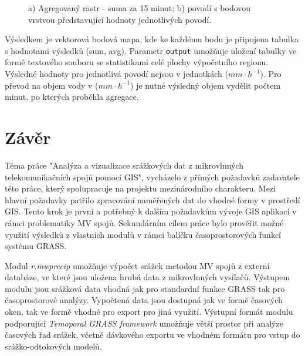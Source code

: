 \documentclass[a4paper,12pt,oneside]{report}
\newcommand{\necislovana}[1]{%
\phantomsection
\addcontentsline{toc}{section}{#1}
\section*{#1}
\markboth{\uppercase{#1}}{}
}
\begin{document}
\begin{figure}[h!]%
    \centering
    \qquad

    \caption[GUI modul]{ a) Agregovaný rastr - suma za 15 minut; b) povodí s bodovou vrstvou představující hodnoty jednotlivých povodí.  \centering  }
\end{figure}

Výsledkem je vektorová bodová mapa, kde ke každému bodu je připojena
tabulka s hodnotami výsledků (sum, avg). Parametr \texttt{output}
umožňuje uložení tabulky ve formě textového souboru se statistikami
celé plochy výpočetního regionu. Výsledné hodnoty pro jednotlivá
povodí nejsou v jednotkách ($mm \cdot h^{-1}$). Pro převod na objem
vody v ($mm \cdot h^{-1}$) je nutné výsledný objem vydělit počtem
minut, po kterých proběhla agregace.



\setcounter{footnote}{1}



\newpage
\necislovana{Závěr}

Téma práce "Analýza a vizualizace srážkových dat z mikrovlnných
telekomunikačních spojů pomocí GIS", vycházelo z přímých požadavků
zadavatele této práce, který spolupracuje na projektu mezinárodního
charakteru. Mezi hlavní požadavky patřilo zpracování naměřených dat do
vhodné formy v prostředí GIS. Tento krok je první a potřebný k dalším
požadavkům vývoje GIS aplikací v rámci problematiky MV
spojů. Sekundárním cílem práce bylo prověřit možné využití
výsledků z vlastních modulů v rámci balíčku časoprostorových funkcí
systému GRASS.

Modul \textit{r.mwprecip} umožňuje výpočet srážek metodou MV spojů z
externí databáze, ve které jsou uložena hrubá data z mikrovlnných
vysílačů. Výstupem modulu jsou srážková data vhodná jak pro standardní
funkce GRASS tak pro časoprostorové analýzy. Vypočtená data jsou
dostupná jak ve formě časových oken, tak ve formě vhodné pro export
pro jiná využití. Výstupní formát modulu podporující \textit{Temoporal GRASS
  framework} umožňuje větší prostor při analýze časových řad srážek,
včetně dávkového exportu ve vhodném formátu pro vstup do
srážko-odtokových modelů.
\end{document}
